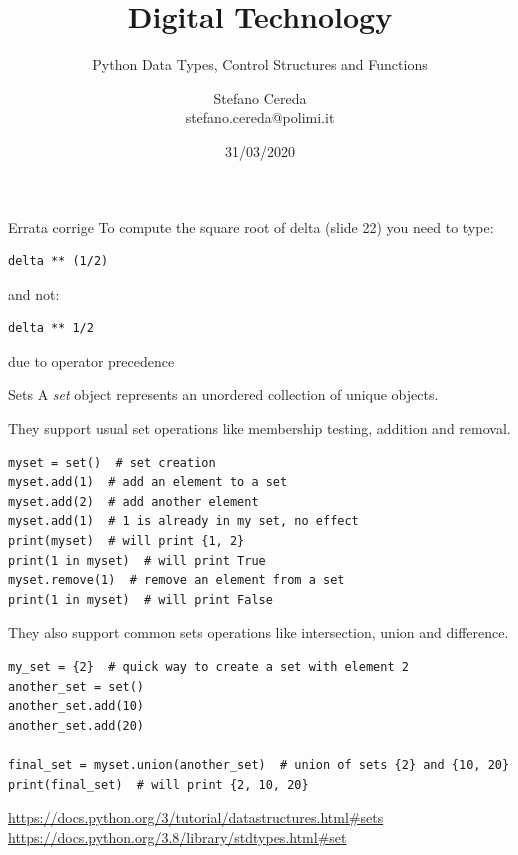 \documentclass[aspectratio=169,]{beamer}
\title{Digital Technology}
\subtitle{Python Data Types, Control Structures and Functions}
\author{Stefano Cereda\\
		stefano.cereda@polimi.it
	}
\date{31/03/2020}
\institute[PoliMi]{Politecnico Milano}
\begin{document}
\begin{frame}
	\maketitle
\end{frame}

\begin{frame}[fragile]{Errata corrige}
    To compute the square root of delta (slide 22) you need to type:
    \begin{verbatim}
delta ** (1/2)
    \end{verbatim}
    and not:
    \begin{verbatim}
delta ** 1/2
    \end{verbatim}
    due to operator precedence
\end{frame}


\begin{frame}{Sets}
    A \emph{set} object represents an \alert{unordered} collection of \alert{unique} objects.

    They support usual set operations like membership testing, addition and removal.
        \begin{verbatim}
myset = set()  # set creation
myset.add(1)  # add an element to a set
myset.add(2)  # add another element
myset.add(1)  # 1 is already in my set, no effect
print(myset)  # will print {1, 2}
print(1 in myset)  # will print True
myset.remove(1)  # remove an element from a set
print(1 in myset)  # will print False
        \end{verbatim}

        \framebreak
        They also support common sets operations like intersection, union and difference.
        \begin{verbatim}
my_set = {2}  # quick way to create a set with element 2
another_set = set()
another_set.add(10)
another_set.add(20)

final_set = myset.union(another_set)  # union of sets {2} and {10, 20}
print(final_set)  # will print {2, 10, 20}
        \end{verbatim}

        \footnotesize{
        \url{https://docs.python.org/3/tutorial/datastructures.html#sets}
        \url{https://docs.python.org/3.8/library/stdtypes.html#set}
        }
\end{frame}
\end{document}
